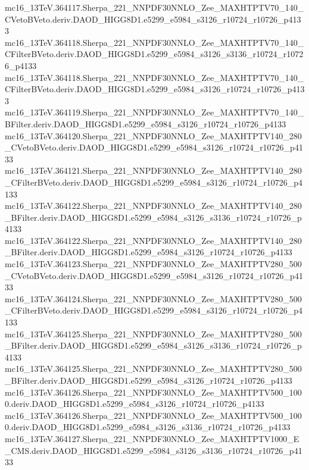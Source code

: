 \begin{footnotesize}
mc16\_13TeV.364117.Sherpa\_221\_NNPDF30NNLO\_Zee\_MAXHTPTV70\_140\_CVetoBVeto.deriv.DAOD\_HIGG8D1.e5299\_e5984\_s3126\_r10724\_r10726\_p4133 \\
mc16\_13TeV.364118.Sherpa\_221\_NNPDF30NNLO\_Zee\_MAXHTPTV70\_140\_CFilterBVeto.deriv.DAOD\_HIGG8D1.e5299\_e5984\_s3126\_s3136\_r10724\_r10726\_p4133 \\
mc16\_13TeV.364118.Sherpa\_221\_NNPDF30NNLO\_Zee\_MAXHTPTV70\_140\_CFilterBVeto.deriv.DAOD\_HIGG8D1.e5299\_e5984\_s3126\_r10724\_r10726\_p4133 \\
mc16\_13TeV.364119.Sherpa\_221\_NNPDF30NNLO\_Zee\_MAXHTPTV70\_140\_BFilter.deriv.DAOD\_HIGG8D1.e5299\_e5984\_s3126\_r10724\_r10726\_p4133 \\
mc16\_13TeV.364120.Sherpa\_221\_NNPDF30NNLO\_Zee\_MAXHTPTV140\_280\_CVetoBVeto.deriv.DAOD\_HIGG8D1.e5299\_e5984\_s3126\_r10724\_r10726\_p4133 \\
mc16\_13TeV.364121.Sherpa\_221\_NNPDF30NNLO\_Zee\_MAXHTPTV140\_280\_CFilterBVeto.deriv.DAOD\_HIGG8D1.e5299\_e5984\_s3126\_r10724\_r10726\_p4133 \\
mc16\_13TeV.364122.Sherpa\_221\_NNPDF30NNLO\_Zee\_MAXHTPTV140\_280\_BFilter.deriv.DAOD\_HIGG8D1.e5299\_e5984\_s3126\_s3136\_r10724\_r10726\_p4133 \\
mc16\_13TeV.364122.Sherpa\_221\_NNPDF30NNLO\_Zee\_MAXHTPTV140\_280\_BFilter.deriv.DAOD\_HIGG8D1.e5299\_e5984\_s3126\_r10724\_r10726\_p4133 \\
mc16\_13TeV.364123.Sherpa\_221\_NNPDF30NNLO\_Zee\_MAXHTPTV280\_500\_CVetoBVeto.deriv.DAOD\_HIGG8D1.e5299\_e5984\_s3126\_r10724\_r10726\_p4133 \\
mc16\_13TeV.364124.Sherpa\_221\_NNPDF30NNLO\_Zee\_MAXHTPTV280\_500\_CFilterBVeto.deriv.DAOD\_HIGG8D1.e5299\_e5984\_s3126\_r10724\_r10726\_p4133 \\
mc16\_13TeV.364125.Sherpa\_221\_NNPDF30NNLO\_Zee\_MAXHTPTV280\_500\_BFilter.deriv.DAOD\_HIGG8D1.e5299\_e5984\_s3126\_s3136\_r10724\_r10726\_p4133 \\
mc16\_13TeV.364125.Sherpa\_221\_NNPDF30NNLO\_Zee\_MAXHTPTV280\_500\_BFilter.deriv.DAOD\_HIGG8D1.e5299\_e5984\_s3126\_r10724\_r10726\_p4133 \\
mc16\_13TeV.364126.Sherpa\_221\_NNPDF30NNLO\_Zee\_MAXHTPTV500\_1000.deriv.DAOD\_HIGG8D1.e5299\_e5984\_s3126\_r10724\_r10726\_p4133 \\
mc16\_13TeV.364126.Sherpa\_221\_NNPDF30NNLO\_Zee\_MAXHTPTV500\_1000.deriv.DAOD\_HIGG8D1.e5299\_e5984\_s3126\_s3136\_r10724\_r10726\_p4133 \\
mc16\_13TeV.364127.Sherpa\_221\_NNPDF30NNLO\_Zee\_MAXHTPTV1000\_E\_CMS.deriv.DAOD\_HIGG8D1.e5299\_e5984\_s3126\_s3136\_r10724\_r10726\_p4133 \\

\end{footnotesize}
